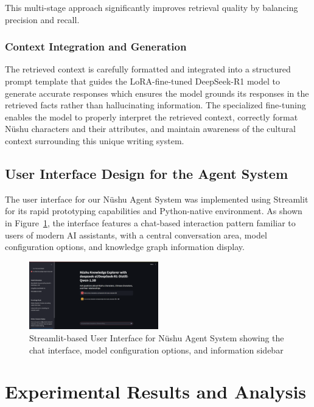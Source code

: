 \documentclass{article}
\begin{document}
    This multi-stage approach significantly improves retrieval quality by balancing precision and recall.
    
    \subsubsection{Context Integration and Generation}
    The retrieved context is carefully formatted and integrated into a structured prompt template that guides the LoRA-fine-tuned DeepSeek-R1 model to generate accurate responses which ensures the model grounds its responses in the retrieved facts rather than hallucinating information. 
    The specialized fine-tuning enables the model to properly interpret the retrieved context, correctly format N\"{u}shu characters and their attributes, and maintain awareness of the cultural context surrounding this unique writing system.
    
\subsection{User Interface Design for the Agent System}
\label{ssec:ui_design}

The user interface for our N\"{u}shu Agent System was implemented using Streamlit for its rapid prototyping capabilities and Python-native environment. As shown in Figure~\ref{fig:streamlit_ui}, the interface features a chat-based interaction pattern familiar to users of modern AI assistants, with a central conversation area, model configuration options, and knowledge graph information display. 

\begin{figure}[htb]
\centering
\includegraphics[width=0.5\textwidth]{images/streamlit.png}
\caption{Streamlit-based User Interface for N\"{u}shu Agent System showing the chat interface, model configuration options, and information sidebar}
\label{fig:streamlit_ui}
\end{figure}



\section{Experimental Results and Analysis}
\label{sec:results}
\end{document}
